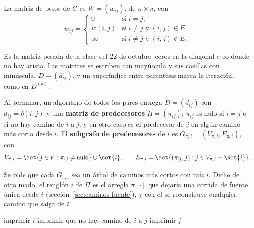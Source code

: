 \documentclass[11pt,letterpaper]{article}
\begin{document}
\begin{definicion}
  \label{def:matriz-pesos-pares}
  La matriz de pesos de $G$ es $W = (w_{ij})$, de $n \times n$, con
  \[
    w_{ij} = \begin{cases}
      0 & \text{si } i = j, \\
      w(i, j) & \text{si } i \neq j \text{ y } (i, j) \in E, \\
      \infty & \text{si } i \neq j \text{ y } (i, j) \notin E.
    \end{cases}
  \]
\end{definicion}

Es la matriz pesada de la clase del 22 de octubre: ceros en la
diagonal e $\infty$ donde no hay arista. Las matrices se escriben con
mayúscula y sus casillas con minúscula, $D = (d_{ij})$, y un
superíndice entre paréntesis marca la iteración, como en $D^{(k)}$.

\begin{definicion}
  \label{def:predecesores-pares}
  Al terminar, un algoritmo de todos los pares entrega $D = (d_{ij})$
  con $d_{ij} = \delta(i, j)$ y una \textbf{matriz de predecesores}
  $\Pi = (\pi_{ij})$: $\pi_{ij}$ es nulo si $i = j$ o si no hay camino
  de $i$ a $j$, y en otro caso es el predecesor de $j$ en algún camino
  más corto desde $i$. El \textbf{subgrafo de predecesores} de $i$ es
  $G_{\pi,i} = (V_{\pi,i}, E_{\pi,i})$, con
  \[
    V_{\pi,i} = \set{j \in V : \pi_{ij} \neq \text{nulo}} \cup \set{i},
    \qquad
    E_{\pi,i} = \set{(\pi_{ij}, j) : j \in V_{\pi,i} - \set{i}} .
  \]
\end{definicion}

Se pide que cada $G_{\pi,i}$ sea un árbol de caminos más cortos con
raíz $i$. Dicho de otro modo, el renglón $i$ de $\Pi$ es el arreglo
$\pi[\cdot]$ que dejaría una corrida de fuente única desde $i$
(sección~\ref{sec:caminos-fuente}), y con él se reconstruye cualquier
camino que salga de $i$.

\begin{algorithm}[H]
\caption{\textsc{Imprimir-Camino-Pares}$(\Pi, i, j)$}
\label{alg:imprimir-pares}
\begin{algorithmic}[1]
    \State imprimir $i$
    \State imprimir que no hay camino de $i$ a $j$
  \Else
    \State {}
    \State imprimir $j$
  \EndIf
\EndProcedure
\end{algorithmic}
\end{algorithm}
\end{document}
